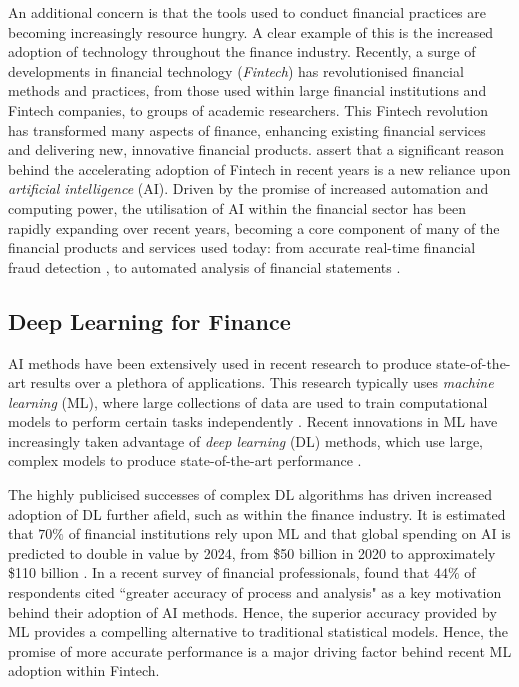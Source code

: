 \documentclass[a4paper, 11pt]{report}
\begin{document}
    An additional concern is that the tools used to conduct financial practices are becoming increasingly resource hungry. A clear example of this is the increased adoption of technology throughout the finance industry. Recently, a surge of developments in financial technology (\emph{Fintech}) has revolutionised financial methods and practices, from those used within large financial institutions and Fintech companies, to groups of academic researchers. This Fintech revolution has transformed many aspects of finance, enhancing existing financial services and delivering new, innovative financial products. \citet{palmie-2020} assert that a significant reason behind the accelerating adoption of Fintech in recent years is a new reliance upon \emph{artificial intelligence} (AI). Driven by the promise of increased automation and computing power, the utilisation of AI within the financial sector has been rapidly expanding over recent years, becoming a core component of many of the financial products and services used today: from accurate real-time financial fraud detection \citep{sadgali-2019}, to automated analysis of financial statements \citep{amel-2020}.


    \subsection{Deep Learning for Finance}

    AI methods have been extensively used in recent research to produce state-of-the-art results over a plethora of applications. This research typically uses \emph{machine learning} (ML), where large collections of data are used to train computational models to perform certain tasks independently \citep{samuel-1959}. Recent innovations in ML have increasingly taken advantage of \emph{deep learning} (DL) methods, which use large, complex models to produce state-of-the-art performance \citep{witten-2017}.

    The highly publicised successes of complex DL algorithms has driven increased adoption of DL further afield, such as within the finance industry. It is estimated that $70\%$ of financial institutions rely upon ML \citep{gokhale-2019} and that global spending on AI is predicted to double in value by 2024, from \$50 billion in 2020 to approximately \$110 billion \citep{oecd-2021}. In a recent survey of financial professionals, \citet{chartis-2019} found that $44\%$ of respondents cited ``greater accuracy of process and analysis" as a key motivation behind their adoption of AI methods. Hence, the superior accuracy provided by ML provides a compelling alternative to traditional statistical models. Hence, the promise of more accurate performance is a major driving factor behind recent ML adoption within Fintech.
\end{document}
